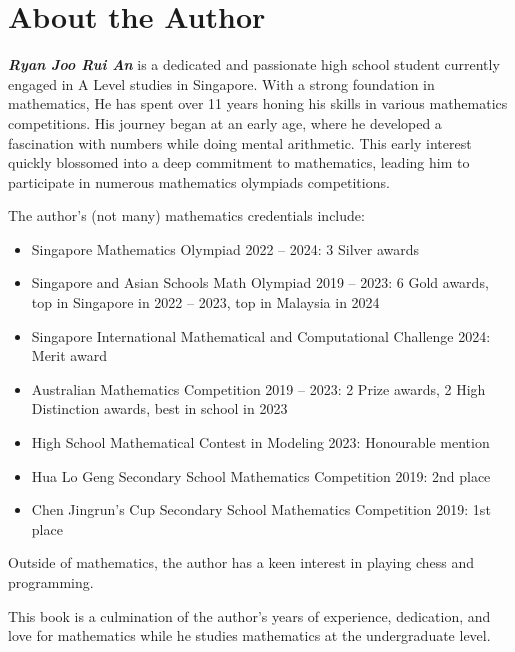 \section*{About the Author}
\textit{\bfseries Ryan Joo Rui An} is a dedicated and passionate high school student currently engaged in A Level studies in Singapore. With a strong foundation in mathematics, He has spent over 11 years honing his skills in various mathematics competitions. His journey began at an early age, where he developed a fascination with numbers while doing mental arithmetic. This early interest quickly blossomed into a deep commitment to mathematics, leading him to participate in numerous mathematics olympiads competitions.

The author's (not many) mathematics credentials include:
\begin{itemize}
\item Singapore Mathematics Olympiad 2022 -- 2024: 3 Silver awards
\item Singapore and Asian Schools Math Olympiad 2019 -- 2023: 6 Gold awards, top in Singapore in 2022 -- 2023, top in Malaysia in 2024
\item Singapore International Mathematical and Computational Challenge 2024: Merit award
\item Australian Mathematics Competition 2019 -- 2023: 2 Prize awards, 2 High Distinction awards, best in school in 2023
\item High School Mathematical Contest in Modeling 2023: Honourable mention
\item Hua Lo Geng Secondary School Mathematics Competition 2019: 2nd place
\item Chen Jingrun's Cup Secondary School Mathematics Competition 2019: 1st place
\end{itemize}

Outside of mathematics, the author has a keen interest in playing chess and programming.

This book is a culmination of the author's years of experience, dedication, and love for mathematics while he studies mathematics at the undergraduate level.